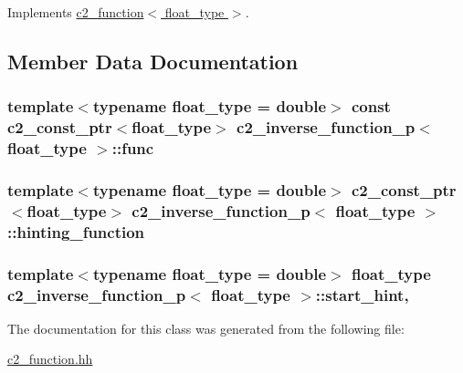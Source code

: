 Implements \hyperlink{classc2__function_a44e0201159111350be7f746fc9026f67}{c2\+\_\+function$<$ float\+\_\+type $>$}.



\subsection{Member Data Documentation}
\subsubsection[{\texorpdfstring{func}{func}}]{\setlength{\rightskip}{0pt plus 5cm}template$<$typename float\+\_\+type  = double$>$ const {\bf c2\+\_\+const\+\_\+ptr}$<$float\+\_\+type$>$ {\bf c2\+\_\+inverse\+\_\+function\+\_\+p}$<$ float\+\_\+type $>$\+::func\hspace{0.3cm}{\ttfamily [protected]}}\hypertarget{classc2__inverse__function__p_af8d083863a7965e901c684de7bd3cf8f}{}\label{classc2__inverse__function__p_af8d083863a7965e901c684de7bd3cf8f}
\subsubsection[{\texorpdfstring{hinting\+\_\+function}{hinting_function}}]{\setlength{\rightskip}{0pt plus 5cm}template$<$typename float\+\_\+type  = double$>$ {\bf c2\+\_\+const\+\_\+ptr}$<$float\+\_\+type$>$ {\bf c2\+\_\+inverse\+\_\+function\+\_\+p}$<$ float\+\_\+type $>$\+::hinting\+\_\+function\hspace{0.3cm}{\ttfamily [protected]}}\hypertarget{classc2__inverse__function__p_a4e1f68a44dea194ec1737fdcc8a7f17f}{}\label{classc2__inverse__function__p_a4e1f68a44dea194ec1737fdcc8a7f17f}
\subsubsection[{\texorpdfstring{start\+\_\+hint}{start_hint}}]{\setlength{\rightskip}{0pt plus 5cm}template$<$typename float\+\_\+type  = double$>$ float\+\_\+type {\bf c2\+\_\+inverse\+\_\+function\+\_\+p}$<$ float\+\_\+type $>$\+::start\+\_\+hint\hspace{0.3cm}{\ttfamily [mutable]}, {\ttfamily [protected]}}\hypertarget{classc2__inverse__function__p_a1d5e1f16d32ff5e8fef9e239ff5c18ed}{}\label{classc2__inverse__function__p_a1d5e1f16d32ff5e8fef9e239ff5c18ed}


The documentation for this class was generated from the following file\+:\begin{DoxyCompactItemize}
\item 
\hyperlink{c2__function_8hh}{c2\+\_\+function.\+hh}\end{DoxyCompactItemize}

